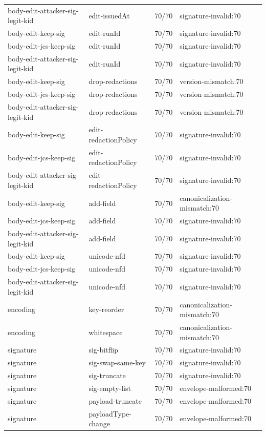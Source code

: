 \begin{table}[t]
\begin{tabular}{@{}llrl@{}}
body-edit-attacker-sig-legit-kid & edit-issuedAt & 70/70 & signature-invalid:70\\
body-edit-keep-sig & edit-runId & 70/70 & signature-invalid:70\\
body-edit-jcs-keep-sig & edit-runId & 70/70 & signature-invalid:70\\
body-edit-attacker-sig-legit-kid & edit-runId & 70/70 & signature-invalid:70\\
body-edit-keep-sig & drop-redactions & 70/70 & version-mismatch:70\\
body-edit-jcs-keep-sig & drop-redactions & 70/70 & version-mismatch:70\\
body-edit-attacker-sig-legit-kid & drop-redactions & 70/70 & version-mismatch:70\\
body-edit-keep-sig & edit-redactionPolicy & 70/70 & signature-invalid:70\\
body-edit-jcs-keep-sig & edit-redactionPolicy & 70/70 & signature-invalid:70\\
body-edit-attacker-sig-legit-kid & edit-redactionPolicy & 70/70 & signature-invalid:70\\
body-edit-keep-sig & add-field & 70/70 & canonicalization-mismatch:70\\
body-edit-jcs-keep-sig & add-field & 70/70 & signature-invalid:70\\
body-edit-attacker-sig-legit-kid & add-field & 70/70 & signature-invalid:70\\
body-edit-keep-sig & unicode-nfd & 70/70 & signature-invalid:70\\
body-edit-jcs-keep-sig & unicode-nfd & 70/70 & signature-invalid:70\\
body-edit-attacker-sig-legit-kid & unicode-nfd & 70/70 & signature-invalid:70\\
encoding & key-reorder & 70/70 & canonicalization-mismatch:70\\
encoding & whitespace & 70/70 & canonicalization-mismatch:70\\
signature & sig-bitflip & 70/70 & signature-invalid:70\\
signature & sig-swap-same-key & 70/70 & signature-invalid:70\\
signature & sig-truncate & 70/70 & signature-invalid:70\\
signature & sig-empty-list & 70/70 & envelope-malformed:70\\
signature & payload-truncate & 70/70 & envelope-malformed:70\\
signature & payloadType-change & 70/70 & envelope-malformed:70\\

\end{tabular}
\end{table}
